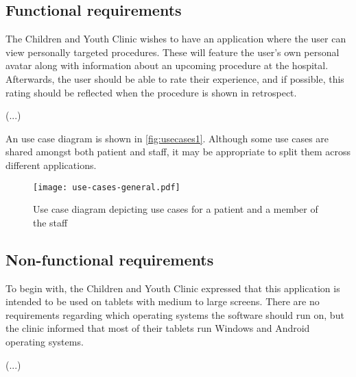 \subsection{Functional requirements}

The Children and Youth Clinic wishes to have an application where the user can view personally targeted procedures. These will feature the user's own personal avatar along with information about an upcoming procedure at the hospital. Afterwards, the user should be able to rate their experience, and if possible, this rating should be reflected when the procedure is shown in retrospect.

(...)

An use case diagram is shown in \autoref{fig:usecases1}. Although some use cases are shared amongst both patient and staff, it may be appropriate to split them across different applications.

\begin{figure}
    \centering
    \texttt{[image: use-cases-general.pdf]}
    \caption{Use case diagram depicting use cases for a patient and a member of the staff}
    \label{fig:usecases1}
\end{figure}

\subsection{Non-functional requirements}

To begin with, the Children and Youth Clinic expressed that this application is intended to be used on tablets with medium to large screens. There are no requirements regarding which operating systems the software should run on, but the clinic informed that most of their tablets run Windows and Android operating systems.

(...)

